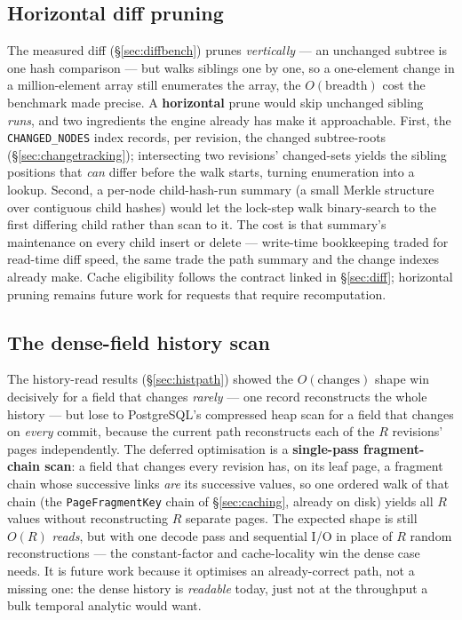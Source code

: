 \documentclass[11pt,a4paper,oneside]{report}
\theoremstyle{sirixthm}
\newcommand{\code}[1]{\texttt{#1}}
\begin{document}
\subsection*{Horizontal diff pruning}

The measured diff (\S\ref{sec:diffbench}) prunes \emph{vertically} --- an unchanged subtree is one hash
comparison --- but walks siblings one by one, so a one-element change in a million-element array still
enumerates the array, the $O(\text{breadth})$ cost the benchmark made precise. A \textbf{horizontal} prune
would skip unchanged sibling \emph{runs}, and two ingredients the engine already has make it approachable.
First, the \code{CHANGED\_NODES} index records, per revision, the changed subtree-roots
(\S\ref{sec:changetracking}); intersecting two revisions' changed-sets yields the sibling positions that
\emph{can} differ before the walk starts, turning enumeration into a lookup. Second, a per-node
child-hash-run summary (a small Merkle structure over contiguous child hashes) would let the lock-step walk
binary-search to the first differing child rather than scan to it. The cost is that summary's maintenance on
every child insert or delete --- write-time bookkeeping traded for read-time diff speed, the same trade the
path summary and the change indexes already make. Cache eligibility follows the contract linked
in \S\ref{sec:diff}; horizontal pruning remains future work for requests that require recomputation.

\subsection*{The dense-field history scan}

The history-read results (\S\ref{sec:histpath}) showed the $O(\text{changes})$ shape win decisively for a
field that changes \emph{rarely} --- one record reconstructs the whole history --- but lose to
PostgreSQL's compressed heap scan for a field that changes on \emph{every} commit, because the current
path reconstructs each of the $R$ revisions' pages independently. The deferred optimisation is a
\textbf{single-pass fragment-chain scan}: a field that changes every revision has, on its leaf page, a
fragment chain whose successive links \emph{are} its successive values, so one ordered walk of that chain
(the \code{PageFragmentKey} chain of \S\ref{sec:caching}, already on disk) yields all $R$ values without
reconstructing $R$ separate pages. The expected shape is still $O(R)$ \emph{reads}, but with one decode
pass and sequential I/O in place of $R$ random reconstructions --- the constant-factor and cache-locality
win the dense case needs. It is future work because it optimises an already-correct path, not a missing
one: the dense history is \emph{readable} today, just not at the throughput a bulk temporal analytic would
want.
\end{document}
